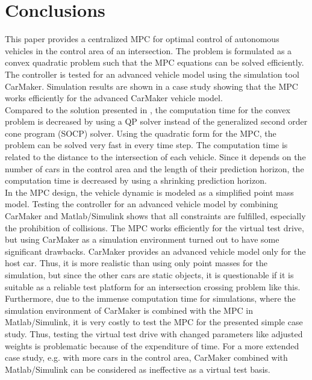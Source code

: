 \documentclass[letterpaper,10pt,conference]{ieeeconf}
\begin{document}
\section{Conclusions} \label{sec:conclusions}
This paper provides a centralized MPC for optimal control of autonomous vehicles in the control area of an intersection. The problem is formulated as a convex quadratic problem such that the MPC equations can be solved efficiently. The controller is tested for an advanced vehicle model using the simulation tool CarMaker. Simulation results are shown in a case study showing that the MPC works efficiently for the advanced CarMaker vehicle model.\\ \indent
Compared to the solution presented in \cite{nikolce}, the computation time for the convex problem is decreased by using a QP solver instead of the generalized second order cone program (SOCP) solver. Using the quadratic form for the MPC, the problem can be solved very fast in every time step. The computation time is related to the distance to the intersection of each vehicle. Since it depends on the number of cars in the control area and the length of their prediction horizon, the computation time is decreased by using a shrinking prediction horizon.\\ \indent
In the MPC design, the vehicle dynamic is modeled as a simplified point mass model. Testing the controller for an advanced vehicle model by combining CarMaker and Matlab/Simulink shows that all constraints are fulfilled, especially the prohibition of collisions. The MPC works efficiently for the virtual test drive, but using CarMaker as a simulation environment turned out to have some significant drawbacks. CarMaker provides an advanced vehicle model only for the host car. Thus, it is more realistic than using only point masses for the simulation, but since the other cars are static objects, it is questionable if it is suitable as a reliable test platform for an intersection crossing problem like this. Furthermore, due to the immense computation time for simulations, where the simulation environment of CarMaker is combined with the MPC in Matlab/Simulink, it is very costly to test the MPC for the presented simple case study. Thus, testing the virtual test drive with changed parameters like adjusted weights is problematic because of the expenditure of time. For a more extended case study, e.g. with more cars in the control area, CarMaker combined with Matlab/Simulink can be considered as ineffective as a virtual test basis.\\ \indent
\end{document}

